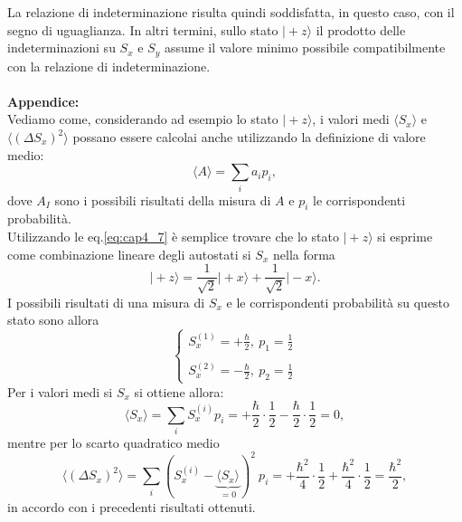 \documentclass[a4paper,12pt,oneside]{book}
\begin{document}
La relazione di indeterminazione risulta quindi soddisfatta, in questo caso, con il segno di uguaglianza. In altri termini, sullo stato $\vert +z \rangle $ il prodotto delle indeterminazioni su $S_x$ e $S_y$ assume il valore minimo possibile compatibilmente con la relazione di indeterminazione.\\ \\
\textbf{Appendice:}\\
Vediamo come, considerando ad esempio lo stato $\vert + z \rangle $, i valori medi $\langle S_x \rangle $ e $\langle (\Delta S_x)^2 \rangle $ possano essere calcolai anche utilizzando la definizione di valore medio:
\begin{equation}
\langle A \rangle = \sum _i a_i p_i,
\end{equation}
dove $A_I$ sono i possibili risultati della misura di $A$ e $p_i$ le corrispondenti probabilità.\\
Utilizzando le eq.\eqref{eq:cap4_7} è semplice trovare che lo stato $\vert +z \rangle$ si esprime come combinazione lineare degli autostati si $S_x$ nella forma
\begin{equation}
\vert +z \rangle = \frac{1}{\sqrt{2}} \vert +x \rangle + \frac{1}{\sqrt{2}} \vert -x \rangle .
\end{equation}
I possibili risultati di una misura di $S_x$ e le corrispondenti probabilità su questo stato sono allora
\begin{equation}
\begin{cases}
\displaystyle{S_x ^{(1)} = +\frac{\hbar}{2}, \ p_1 = \frac{1}{2}} \\
\\
\displaystyle{S_x ^{(2)} = -\frac{\hbar}{2}, \ p_2 = \frac{1}{2}}
\end{cases}
\end{equation}
Per i valori medi si $S_x$ si ottiene allora:
\begin{equation}
\langle S_x \rangle = \sum _i S_x ^{(i)} p_i= +\frac{\hbar}{2}\cdot\frac{1}{2}-\frac{\hbar}{2}\cdot\frac{1}{2}=0,
\end{equation}
mentre per lo scarto quadratico medio
\begin{equation}
\langle (\Delta S_x)^2 \rangle = \sum _i ( S_x ^{(i)}- \underbrace{\langle S_x \rangle}_{=0}) ^2\ p_i= +\frac{\hbar ^2}{4}\cdot\frac{1}{2}+\frac{\hbar ^2}{4}\cdot\frac{1}{2}= \frac{\hbar ^2}{2},
\end{equation}
in accordo con i precedenti risultati ottenuti.
\end{document}
